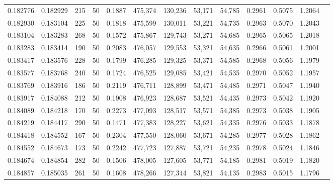\begin{tabular}{rrrrrrrrrrrrr}
0.182776 & 0.182929 &   215 &  50 &                                     0.1887 & 475,374 & 130,236 &  53,171 &  54,785 & 0.2961 & 0.5075 & 1.2064 \\
0.182930 & 0.183104 &   225 &  50 &                                     0.1818 & 475,599 & 130,011 &  53,221 &  54,735 & 0.2963 & 0.5070 & 1.2043 \\
0.183104 & 0.183283 &   268 &  50 &                                     0.1572 & 475,867 & 129,743 &  53,271 &  54,685 & 0.2965 & 0.5065 & 1.2018 \\
0.183283 & 0.183414 &   190 &  50 &                                     0.2083 & 476,057 & 129,553 &  53,321 &  54,635 & 0.2966 & 0.5061 & 1.2001 \\
0.183417 & 0.183576 &   228 &  50 &                                     0.1799 & 476,285 & 129,325 &  53,371 &  54,585 & 0.2968 & 0.5056 & 1.1979 \\
0.183577 & 0.183768 &   240 &  50 &                                     0.1724 & 476,525 & 129,085 &  53,421 &  54,535 & 0.2970 & 0.5052 & 1.1957 \\
0.183769 & 0.183916 &   186 &  50 &                                     0.2119 & 476,711 & 128,899 &  53,471 &  54,485 & 0.2971 & 0.5047 & 1.1940 \\
0.183917 & 0.184088 &   212 &  50 &                                     0.1908 & 476,923 & 128,687 &  53,521 &  54,435 & 0.2973 & 0.5042 & 1.1920 \\
0.184089 & 0.184218 &   170 &  50 &                                     0.2273 & 477,093 & 128,517 &  53,571 &  54,385 & 0.2973 & 0.5038 & 1.1905 \\
0.184219 & 0.184417 &   290 &  50 &                                     0.1471 & 477,383 & 128,227 &  53,621 &  54,335 & 0.2976 & 0.5033 & 1.1878 \\
0.184418 & 0.184552 &   167 &  50 &                                     0.2304 & 477,550 & 128,060 &  53,671 &  54,285 & 0.2977 & 0.5028 & 1.1862 \\
0.184552 & 0.184673 &   173 &  50 &                                     0.2242 & 477,723 & 127,887 &  53,721 &  54,235 & 0.2978 & 0.5024 & 1.1846 \\
0.184674 & 0.184854 &   282 &  50 &                                     0.1506 & 478,005 & 127,605 &  53,771 &  54,185 & 0.2981 & 0.5019 & 1.1820 \\
0.184857 & 0.185035 &   261 &  50 &                                     0.1608 & 478,266 & 127,344 &  53,821 &  54,135 & 0.2983 & 0.5015 & 1.1796 \\

\end{tabular}

